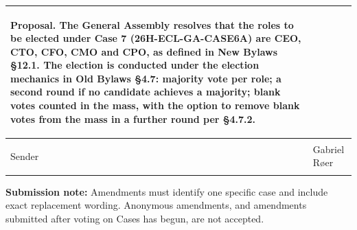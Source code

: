 \documentclass{../../Common/Latex/Templates/rapport}
\begin{document}
\begin{tabularx}{\textwidth}{|>{\bfseries\raggedright\arraybackslash}p{3.7cm}|X|}
  \textbf{Proposal.} The General Assembly resolves that the roles to be elected under Case 7 (26H-ECL-GA-CASE6A) are CEO, CTO, CFO, CMO and CPO, as defined in New Bylaws \S 12.1. The election is conducted under the election mechanics in Old Bylaws \S 4.7: majority vote per role; a second round if no candidate achieves a majority; blank votes counted in the mass, with the option to remove blank votes from the mass in a further round per \S 4.7.2.                                                                                                                                                                                                                                                                               \\
  \hline
  Sender
   & \rule{0pt}{1.2cm}Gabriel Røer                                                                                                                                                                                                                                                                                                                                                                                                                                                                                                                                                                                                                                                                                                              \\
  \hline
\end{tabularx}

\vfill
\textbf{Submission note:} Amendments must identify one specific case and include exact replacement wording. Anonymous amendments, and amendments submitted after voting on Cases has begun, are not accepted.
\end{document}
